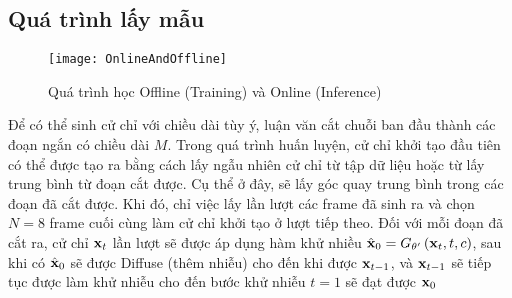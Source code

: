 \subsection{Quá trình lấy mẫu}

\begin{figure}[H]
	\centering
	\texttt{[image: OnlineAndOffline]}
	\caption{Quá trình học Offline (Training) và Online (Inference)}
	\label{fig:OnlineAndOffline}
\end{figure}

Để có thể sinh cử chỉ với chiều dài tùy ý, luận văn cắt chuỗi ban đầu thành các đoạn ngắn có chiều dài $M$. Trong quá trình huấn luyện, cử chỉ khởi tạo đầu tiên có thể được tạo ra bằng cách lấy ngẫu nhiên cử chỉ từ tập dữ liệu hoặc từ lấy trung bình từ đoạn cắt được. Cụ thể ở đây, sẽ lấy góc quay trung bình trong các đoạn đã cắt được. Khi đó, chỉ việc lấy lần lượt các frame đã sinh ra và chọn $N = 8$ frame cuối cùng làm cử chỉ khởi tạo ở lượt tiếp theo. Đối với mỗi đoạn đã cắt ra, cử chỉ $\mathbf{x}_{t}$ lần lượt sẽ được áp dụng hàm khử nhiều $\hat{\mathbf{x}}_{0} = G_{\theta'} \left( \mathbf{x}_{t}, t, c\right)$, sau khi có $\hat{\mathbf{x}}_{0}$ sẽ được Diffuse (thêm nhiễu) cho đến khi được  $\mathbf{x}_{t-1}$, và $\mathbf{x}_{t-1}$ sẽ tiếp tục được làm khử nhiễu cho đến bước khử nhiễu $t=1$ sẽ đạt được $\mathbf{x}_{0}$ 

